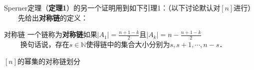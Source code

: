 Sperner定理（\textbf{定理1}）的另一个证明用到如下引理1：（以下讨论默认对$[n]$进行）\\
$\qquad$先给出\textbf{对称链}的定义：

\begin{definition}{对称链}
一个链称为\textbf{对称链}如果$|A_1|=\frac{n+1-k}{2}$且$|A_k|=n-\frac{n+1-k}{2}$\\
$\qquad$
换句话说，存在$s\in \mathbb{N}$使得链中的集合大小分别为$s,s+1,\cdots,n-s$．
\end{definition}

\begin{lemma}{$[n]$的幂集的对称链划分}


\end{lemma}


